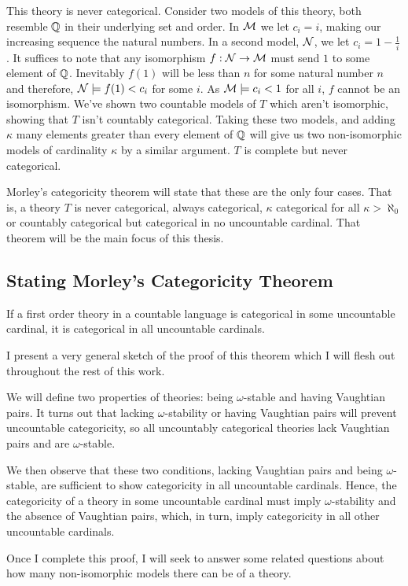 \begin{example}
This theory is never categorical.
Consider two models of this theory, both resemble \(\mathbb{Q}\) in their underlying set and order.
In \(\mathcal{M}\) we let \(c_i = i\), making our increasing sequence the natural numbers. 
In a second model, \(\mathcal{N}\), we let \(c_i = 1 - \frac{1}{i}\).
It suffices to note that any isomorphism \(f: \mathcal{N} \to \mathcal{M}\) must send \(1\) to some element of \(\mathbb{Q}\).
Inevitably \(f(1)\) will be less than \(n\) for some natural number \(n\) and therefore, \(\mathcal{N} \models f(1) < c_i\) for some \(i\).
As \(\mathcal{M} \models c_i < 1\) for all \(i\), \(f\) cannot be an isomorphism. 
We've shown two countable models of \(T\) which aren't isomorphic, showing that \(T\) isn't countably categorical. 
Taking these two models, and adding \(\kappa\) many elements greater than every element of \(\mathbb{Q}\) will give us two non-isomorphic models of cardinality \(\kappa\) by a similar argument. \(T\) is complete but never categorical. 
\end{example}

Morley's categoricity theorem will state that these are the only four cases.
That is, a theory \(T\) is never categorical, always categorical, \(\kappa\) categorical for all \(\kappa > \aleph_0\) or countably categorical but categorical in no uncountable cardinal.  
That theorem will be the main focus of this thesis. 

\subsection{Stating Morley's Categoricity Theorem}

\begin{theorem}\label{theorem_morleys_categoricity}
If a first order theory in a countable language is categorical in some uncountable cardinal, it is categorical in all uncountable cardinals. 
\end{theorem}

I present a very general sketch of the proof of this theorem which I will flesh out throughout the rest of this work. 

We will define two properties of theories: being \(\omega\)-stable and having Vaughtian pairs. 
It turns out that lacking \(\omega\)-stability or having Vaughtian pairs will prevent uncountable categoricity, so all uncountably categorical theories lack Vaughtian pairs and are \(\omega\)-stable. 

We then observe that these two conditions, lacking Vaughtian pairs and being \(\omega\)-stable, are sufficient to show categoricity in all uncountable cardinals. 
Hence, the categoricity of a theory in some uncountable cardinal must imply \(\omega\)-stability and the absence of Vaughtian pairs, which, in turn, imply categoricity in all other uncountable cardinals.

Once I complete this proof, I will seek to answer some related questions about how many non-isomorphic models there can be of a theory. 

